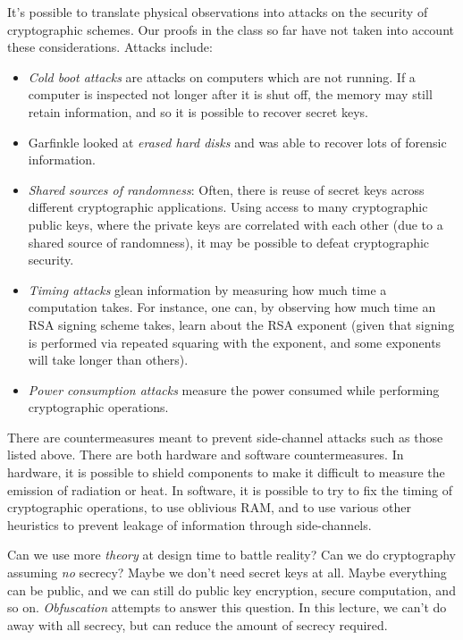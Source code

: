 \documentclass[10pt]{article}
\begin{document}
It's possible to translate physical observations into attacks on the security of cryptographic schemes. Our proofs in the class so far have not taken into account these considerations. Attacks include:

\begin{itemize}
\item \emph{Cold boot attacks} are attacks on computers which are not running. If a computer is inspected not longer after it is shut off, the memory may still retain information, and so it is possible to recover secret keys.
\item Garfinkle \cite{garfinkel2003} looked at \emph{erased hard disks} and was able to recover lots of forensic information.
\item \emph{Shared sources of randomness}: Often, there is reuse of secret keys across different cryptographic applications. Using access to many cryptographic public keys, where the private keys are correlated with each other (due to a shared source of randomness), it may be possible to defeat cryptographic security.
\item \emph{Timing attacks} glean information by measuring how much time a computation takes. For instance, one can, by observing how much time an RSA signing scheme takes, learn about the RSA exponent (given that signing is performed via repeated squaring with the exponent, and some exponents will take longer than others).
\item \emph{Power consumption attacks} measure the power consumed while performing cryptographic operations.
\end{itemize}

There are countermeasures meant to prevent side-channel attacks such as those listed above. There are both hardware and software countermeasures. In hardware, it is possible to shield components to make it difficult to measure the emission of radiation or heat. In software, it is possible to try to fix the timing of cryptographic operations, to use oblivious RAM, and to use various other heuristics to prevent leakage of information through side-channels.

Can we use more \emph{theory} at design time to battle reality? Can we do cryptography assuming \emph{no} secrecy? Maybe we don't need secret keys at all. Maybe everything can be public, and we can still do public key encryption, secure computation, and so on. \emph{Obfuscation} attempts to answer this question. In this lecture, we can't do away with all secrecy, but can reduce the amount of secrecy required.
\end{document}
